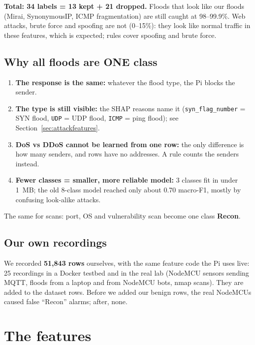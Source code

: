 \documentclass[11pt,a4paper]{article}
\newcommand{\file}[1]{\texttt{\small #1}}
\begin{document}
\textbf{Total: 34 labels = 13 kept + 21 dropped.} Floods that look like our floods (Mirai, SynonymousIP, ICMP
fragmentation) are still caught at 98--99.9\%. Web attacks, brute force and spoofing are not (0--15\%): they look
like normal traffic in these features, which is expected; rules cover spoofing and brute force.

\subsection{Why all floods are ONE class}

\begin{enumerate}
  \item \textbf{The response is the same:} whatever the flood type, the Pi blocks the sender.
  \item \textbf{The type is still visible:} the SHAP reasons name it (\file{syn\_flag\_number} = SYN flood,
        \file{UDP} = UDP flood, \file{ICMP} = ping flood); see Section~\ref{sec:attackfeatures}.
  \item \textbf{DoS vs DDoS cannot be learned from one row:} the only difference is how many senders, and rows have
        no addresses. A rule counts the senders instead.
  \item \textbf{Fewer classes = smaller, more reliable model:} 3 classes fit in under 1~MB; the old 8-class model
        reached only about 0.70 macro-F1, mostly by confusing look-alike attacks.
\end{enumerate}

The same for scans: port, OS and vulnerability scan become one class \textbf{Recon}.

\subsection{Our own recordings}

We recorded \textbf{51,843 rows} ourselves, with the same feature code the Pi uses live: 25 recordings in a Docker
testbed and in the real lab (NodeMCU sensors sending MQTT, floods from a laptop and from NodeMCU bots, nmap scans).
They are added to the dataset rows. Before we added our benign rows, the real NodeMCUs caused false ``Recon''
alarms; after, none.

\section{The features}
\end{document}
